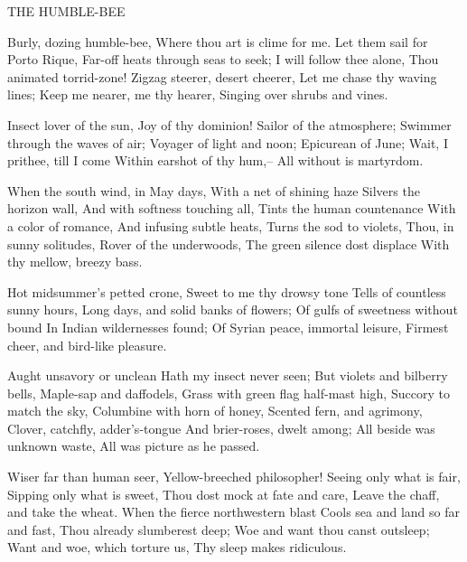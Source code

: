 THE HUMBLE-BEE

Burly, dozing humble-bee,
Where thou art is clime for me.
Let them sail for Porto Rique,
Far-off heats through seas to seek;
I will follow thee alone,
Thou animated torrid-zone!
Zigzag steerer, desert cheerer,
Let me chase thy waving lines;
Keep me nearer, me thy hearer,
Singing over shrubs and vines.

Insect lover of the sun,
Joy of thy dominion!
Sailor of the atmosphere;
Swimmer through the waves of air;
Voyager of light and noon;
Epicurean of June;
Wait, I prithee, till I come
Within earshot of thy hum,--
All without is martyrdom.

When the south wind, in May days,
With a net of shining haze
Silvers the horizon wall,
And with softness touching all,
Tints the human countenance
With a color of romance,
And infusing subtle heats,
Turns the sod to violets,
Thou, in sunny solitudes,
Rover of the underwoods,
The green silence dost displace
With thy mellow, breezy bass.

Hot midsummer's petted crone,
Sweet to me thy drowsy tone
Tells of countless sunny hours,
Long days, and solid banks of flowers;
Of gulfs of sweetness without bound
In Indian wildernesses found;
Of Syrian peace, immortal leisure,
Firmest cheer, and bird-like pleasure.

Aught unsavory or unclean
Hath my insect never seen;
But violets and bilberry bells,
Maple-sap and daffodels,
Grass with green flag half-mast high,
Succory to match the sky,
Columbine with horn of honey,
Scented fern, and agrimony,
Clover, catchfly, adder's-tongue
And brier-roses, dwelt among;
All beside was unknown waste,
All was picture as he passed.

Wiser far than human seer,
Yellow-breeched philosopher!
Seeing only what is fair,
Sipping only what is sweet,
Thou dost mock at fate and care,
Leave the chaff, and take the wheat.
When the fierce northwestern blast
Cools sea and land so far and fast,
Thou already slumberest deep;
Woe and want thou canst outsleep;
Want and woe, which torture us,
Thy sleep makes ridiculous.
